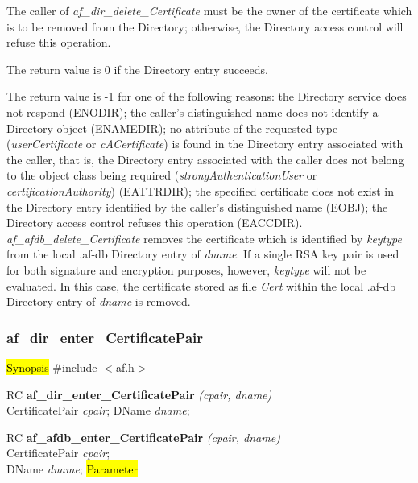 The caller of {\em af\_dir\_delete\_Certificate} must be the owner of the certificate
which is to be removed from the Directory; otherwise, the Directory access control
will refuse this operation.

The return value is 0 if the Directory entry succeeds.

The return value is -1 for one of the following reasons:
\bi
\m the Directory service does not respond (ENODIR);
\m the caller's distinguished name does not identify a Directory object (ENAMEDIR);
\m no attribute of the requested type ({\em userCertificate} or {\em cACertificate})
is found in the Directory entry associated with the caller, that is, the Directory entry
associated with the caller does not belong to the object class being required
({\em strongAuthenticationUser} or {\em certificationAuthority}) (EATTRDIR);
\m the specified certificate does not exist in the Directory entry 
identified by the caller's distinguished name (EOBJ);
\m the Directory access control refuses this operation (EACCDIR).
\ei
{\em af\_afdb\_delete\_Certificate} removes the certificate which is
identified by {\em keytype} from the 
local .af-db Directory entry of {\em dname}. If a single RSA key pair is used for both signature and encryption purposes, however,
{\em keytype} will not be evaluated. In this case, the certificate stored as file {\em Cert} within the
local .af-db Directory entry of {\em dname} is removed.



\subsubsection{af\_dir\_enter\_CertificatePair}
\hl{Synopsis}
\#include $<$af.h$>$ 

RC {\bf af\_dir\_enter\_CertificatePair} {\em (cpair, dname)} \\
CertificatePair {\em *cpair};
DName {\em *dname};

RC {\bf af\_afdb\_enter\_CertificatePair} {\em (cpair, dname)} \\
CertificatePair {\em *cpair}; \\ 
DName {\em *dname};
\hl{Parameter}


